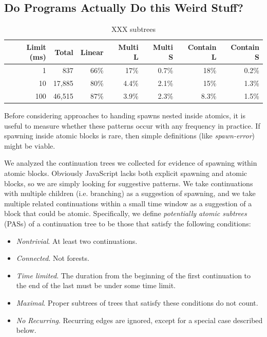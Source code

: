 \documentclass[acmsmall,anonymous,review]{acmart}\settopmatter{printfolios=true,printccs=false,printacmref=false}
\begin{document}

\subsection{Do Programs Actually Do this Weird Stuff?}

\begin{table}
  \centering
  \begin{tabular}{|r|r|r|r|r|r|r|}
    \hline
    Limit (ms) &  Total & Linear & Multi L & Multi S & Contain L & Contain S \\
    \hline
    1          &    837 &   66\% &    17\% &   0.7\% &      18\% &     0.2\% \\
    \hline
    10         & 17,885 &   80\% &   4.4\% &   2.1\% &      15\% &     1.3\% \\
    \hline
    100        & 46,515 &   87\% &   3.9\% &   2.3\% &     8.3\% &     1.5\% \\
    \hline
  \end{tabular}
  \caption{XXX subtrees}
  \label{table:subtrees}
\end{table}

Before considering approaches to handing spawns nested inside atomics, it is useful to measure whether these patterns occur with any frequency in practice.
If spawning inside atomic blocks is rare, then simple definitions (like \emph{spawn-error}) might be viable.

We analyzed the continuation trees we collected for evidence of spawning within atomic blocks.
Obviously JavaScript lacks both explicit spawning and atomic blocks, so we are simply looking for suggestive patterns.
We take continuations with multiple children (i.e. branching) as a suggestion of spawning, and we take multiple related continuations within a small time window as a suggestion of a block that could be atomic.
Specifically, we define \emph{potentially atomic subtrees} (PASs) of a continuation tree to be those that satisfy the following conditions:

\begin{itemize}
\item \emph{Nontrivial}. At least two continuations.
\item \emph{Connected}. Not forests.
\item \emph{Time limited}. The duration from the beginning of the first continuation to the end of the last must be under some time limit.
\item \emph{Maximal}. Proper subtrees of trees that satisfy these conditions do not count.
\item \emph{No Recurring}. Recurring edges are ignored, except for a special case described below.
\end{itemize}
\end{document}
